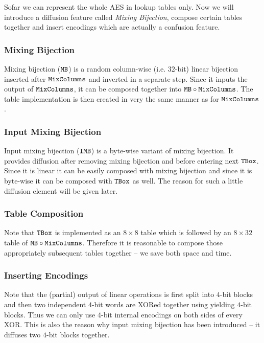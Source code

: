Sofar we can represent the whole AES in lookup tables only. Now we will introduce a diffusion feature called {\em Mixing Bijection}, compose certain tables together and insert encodings which are actually a confusion feature.

\subsubsection{Mixing Bijection}
	
	Mixing bijection ($\texttt{MB}$) is a random column-wise (i.e. $32$-bit) linear bijection inserted after $\texttt{MixColumns}$ and inverted in a separate step. Since it inputs the output of $\texttt{MixColumns}$, it can be composed together into $\texttt{MB}\circ\texttt{MixColumns}$. The table implementation is then created in very the same manner as for $\texttt{MixColumns}$.
	

\subsubsection{Input Mixing Bijection}
	
	Input mixing bijection ($\texttt{IMB}$) is a byte-wise variant of mixing bijection. It provides diffusion after removing mixing bijection and before entering next $\texttt{TBox}$. Since it is linear it can be easily composed with mixing bijection and since it is byte-wise it can be composed with $\texttt{TBox}$ as well. The reason for such a little diffusion element will be given later.

\subsubsection{Table Composition}
	
	Note that $\texttt{TBox}$ is implemented as an $8\times 8$ table which is followed by an $8\times 32$ table of $\texttt{MB}\circ\texttt{MixColumns}$. Therefore it is reasonable to compose those appropriately subsequent tables together -- we save both space and time.

\subsubsection{Inserting Encodings}
	
	Note that the (partial) output of linear operations is first split into $4$-bit blocks and then two independent $4$-bit words are XORed together using yielding $4$-bit blocks. Thus we can only use $4$-bit internal encodings on both sides of every XOR. This is also the reason why input mixing bijection has been introduced -- it diffuses two $4$-bit blocks together.
	
	